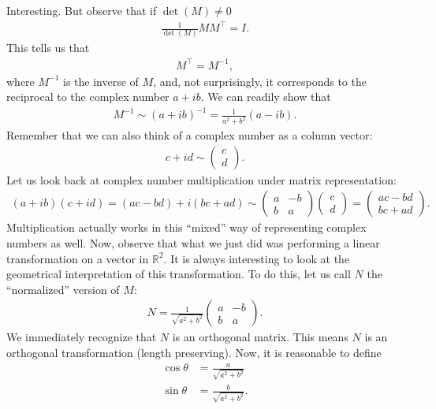 \documentclass{article}
\theoremstyle{definition}
\newcommand{\R}{\mathbb{R}}
\begin{document}
Interesting. But observe that if $\det(M) \neq 0$
\begin{align*}
\frac{1}{\det(M)}MM^\top = I.
\end{align*}
This tells us that
\begin{align*}
M^\top = M^{-1},
\end{align*}
where $M^{-1}$ is the inverse of $M$, and, not surprisingly, it corresponds to the reciprocal to the complex number $a+ib$. We can readily show that
\begin{align*}
M^{-1} \sim (a+ib)^{-1} = \frac{1}{a^2+b^2}(a-ib).
\end{align*} 
Remember that we can also think of a complex number as a column vector:
\begin{align*}
c + id \sim \begin{pmatrix}
c\\d
\end{pmatrix}.
\end{align*}
Let us look back at complex number multiplication under matrix representation:
\begin{align*}
(a+ib)(c+id) = (ac-bd) + i(bc + ad) \sim \begin{pmatrix}
a & -b\\
b & a
\end{pmatrix}
\begin{pmatrix}
c\\d
\end{pmatrix}=
\begin{pmatrix}
ac-bd\\
bc +ad
\end{pmatrix}.
\end{align*}
Multiplication actually works in this ``mixed'' way of representing complex numbers as well. Now, observe that what we just did was performing a linear transformation on a vector in $\R^2$. It is always interesting to look at the geometrical interpretation of this transformation. To do this, let us call $N$ the ``normalized'' version of $M$:
\begin{align*}
N = \frac{1}{\sqrt{a^2 + b^2}}\begin{pmatrix}
a & -b\\
b & a
\end{pmatrix}.
\end{align*}
We immediately recognize that $N$ is an orthogonal matrix. This means $N$ is an orthogonal transformation (length preserving). Now, it is reasonable to define
\begin{align*}
\cos\theta &= \frac{a}{\sqrt{a^2 + b^2}}\\
\sin\theta &= \frac{b}{\sqrt{a^2+b^2}}.
\end{align*}
\end{document}
